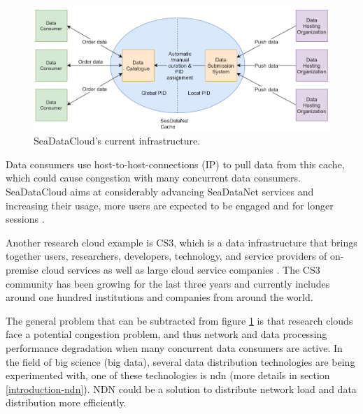 \begin{figure}[H]
\centering
\includegraphics[scale=0.57]{Images/SDC_current.png}
\caption{SeaDataCloud's current infrastructure.}
\label{fig:sdc_cur}
\end{figure}

Data consumers use host-to-host-connections (IP) to pull data from this cache, which could cause congestion with many concurrent data consumers. SeaDataCloud aims at considerably advancing SeaDataNet services and increasing their usage, more users are expected to be engaged and for longer sessions \cite{sdc-eu}.
 
Another research cloud example is CS3, which is a data infrastructure that brings together users, researchers, developers, technology, and service providers of on-premise cloud services as well as large cloud service companies \cite{cs3}. The CS3 community has been growing for the last three years and currently includes around one hundred institutions and companies from around the world.

The general problem that can be subtracted from figure \ref{fig:sdc_cur} is that research clouds face a potential congestion problem, and thus network and data processing performance degradation when many concurrent data consumers are active. In the field of big science (big data), several data distribution technologies are being experimented with, one of these technologies is \gls{ndn} (more details in section \ref{introduction-ndn}). NDN could be a solution to distribute network load and data distribution more efficiently.


